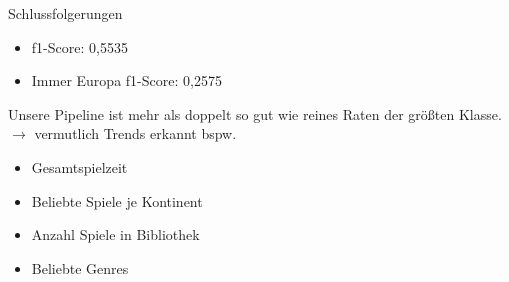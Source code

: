 \documentclass[12pt]{beamer}
\begin{document}
\begin{frame}[fragile]{Schlussfolgerungen}
	\begin{itemize}
		\item f1-Score: 0,5535
		\item Immer Europa f1-Score: 0,2575
	\end{itemize}
	Unsere Pipeline ist mehr als doppelt so gut wie reines Raten der größten Klasse. \\
	$ \rightarrow $ vermutlich Trends erkannt bspw.
	\begin{itemize}
		\item Gesamtspielzeit
		\item Beliebte Spiele je Kontinent
		\item Anzahl Spiele in Bibliothek
		\item Beliebte Genres
	\end{itemize}  
\end{frame}
\end{document}
